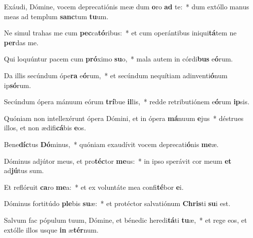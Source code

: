 \item Exáudi, Dómine, vocem deprecatiónis meæ dum \textbf{o}ro \textbf{ad} te:~* dum extóllo manus meas ad templum \textbf{sanc}tum \textbf{tu}um.
\item Ne simul trahas me cum \textbf{pec}ca\textbf{tó}ribus:~* et cum operántibus iniqui\textbf{tá}tem ne \textbf{per}das me.
\item Qui loquúntur pacem cum \textbf{pró}ximo \textbf{su}o,~* mala autem in córdi\textbf{bus} e\textbf{ó}rum.
\item Da illis secúndum ópe\textbf{ra} e\textbf{ó}rum,~* et secúndum nequítiam adinventi\textbf{ó}num ip\textbf{só}rum.
\item Secúndum ópera mánuum eórum \textbf{trí}bue \textbf{il}lis,~* redde retributiónem e\textbf{ó}rum \textbf{ip}sis.
\item Quóniam non intellexérunt ópera Dómini, et in ópera \textbf{má}nuum \textbf{e}jus~* déstrues illos, et non ædifi\textbf{cá}bis \textbf{e}os.
\item Bene\textbf{díc}tus \textbf{Dó}minus,~* quóniam exaudívit vocem deprecati\textbf{ó}nis \textbf{me}æ.
\item Dóminus adjútor meus, et pro\textbf{téc}tor \textbf{me}us:~* in ipso sperávit cor meum \textbf{et} ad\textbf{jú}tus sum.
\item Et reflóruit \textbf{ca}ro \textbf{me}a:~* et ex voluntáte mea confi\textbf{té}bor \textbf{e}i.
\item Dóminus fortitúdo \textbf{ple}bis \textbf{su}æ:~* et protéctor salvatiónum \textbf{Chris}ti \textbf{su}i est.
\item Salvum fac pópulum tuum, Dómine, et bénedic heredi\textbf{tá}ti \textbf{tu}æ,~* et rege eos, et extólle illos usque \textbf{in} æ\textbf{tér}num.
